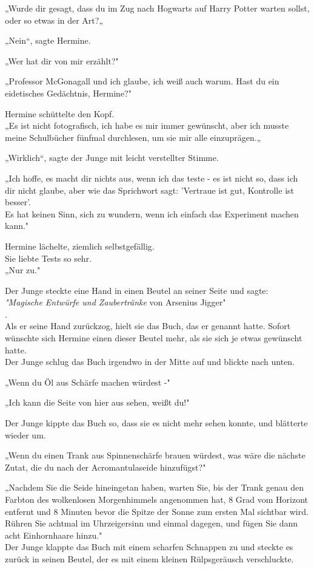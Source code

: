 {„Wurde dir gesagt, dass du im Zug nach Hogwarts auf Harry Potter warten sollst, oder so etwas in der Art?„

„Nein“, sagte Hermine.

„Wer hat dir von mir erzählt?"

„Professor McGonagall und ich glaube, ich weiß auch warum. Hast du ein eidetisches Gedächtnis, Hermine?"

Hermine schüttelte den Kopf.\\ „Es ist nicht fotografisch, ich habe es mir immer gewünscht, aber ich musste meine Schulbücher fünfmal durchlesen, um sie mir alle einzuprägen.„

„Wirklich“, sagte der Junge mit leicht verstellter Stimme.

„Ich hoffe, es macht dir nichts aus, wenn ich das teste - es ist nicht so, dass ich dir nicht glaube, aber wie das Sprichwort sagt: 'Vertraue ist gut, Kontrolle ist besser'.\\ Es hat keinen Sinn, sich zu wundern, wenn ich einfach das Experiment machen kann."

Hermine lächelte, ziemlich selbstgefällig.\\ Sie liebte Tests so sehr.\\ „Nur zu."

Der Junge steckte eine Hand in einen Beutel an seiner Seite und sagte:\\ \emph{"Magische Entwürfe und Zaubertränke} von Arsenius Jigger"\\ .\\ Als er seine Hand zurückzog, hielt sie das Buch, das er genannt hatte. Sofort wünschte sich Hermine einen dieser Beutel mehr, als sie sich je etwas gewünscht hatte.\\ Der Junge schlug das Buch irgendwo in der Mitte auf und blickte nach unten.

„Wenn du Öl aus Schärfe machen würdest -"

„Ich kann die Seite von hier aus sehen, weißt du!"

Der Junge kippte das Buch so, dass sie es nicht mehr sehen konnte, und blätterte wieder um.

„Wenn du einen Trank aus Spinnenschärfe brauen würdest, was wäre die nächste Zutat, die du nach der Acromantulaseide hinzufügst?"

„Nachdem Sie die Seide hineingetan haben, warten Sie, bis der Trank genau den Farbton des wolkenlosen Morgenhimmels angenommen hat, 8 Grad vom Horizont entfernt und 8 Minuten bevor die Spitze der Sonne zum ersten Mal sichtbar wird.\\ Rühren Sie achtmal im Uhrzeigersinn und einmal dagegen, und fügen Sie dann acht Einhornhaare hinzu."\\ Der Junge klappte das Buch mit einem scharfen Schnappen zu und steckte es zurück in seinen Beutel, der es mit einem kleinen Rülpsgeräusch verschluckte.

}
